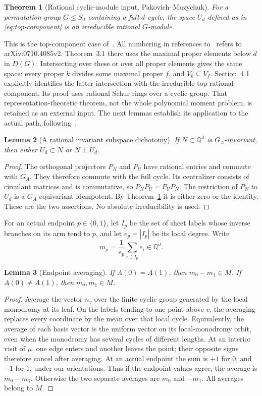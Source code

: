 \documentclass[11pt]{article}
\numberwithin{equation}{section}
\newtheorem{theorem}{Theorem}[section]
\newtheorem{lemma}[theorem]{Lemma}
\theoremstyle{definition}\newtheorem{definition}[theorem]{Definition}
\theoremstyle{remark}\newtheorem{remark}[theorem]{Remark}
\newcommand{\Q}{\mathbb Q}
\begin{document}
\begin{theorem}[Rational cyclic-module input, Pakovich--Muzychuk]
\label{thm:rational-input}
For a permutation group $G\le S_d$ containing a full $d$-cycle, the
space $U_d$ defined as in \eqref{eq:top-component} is an irreducible
rational $G$-module.
\end{theorem}
This is the top-component case of~\cite[Theorem~3.1 and Section~4.1]{PM}.
All numbering in references to~\cite{PM} refers to arXiv:0710.4085v2.
Theorem~3.1 there uses the maximal proper elements below $d$ in $D(G)$.
Intersecting over these or over all proper elements gives the same
space: every proper $k$ divides some maximal proper $f$, and
$V_k\subseteq V_f$. Section~4.1 explicitly identifies the latter
intersection with the irreducible top rational component.
Its proof uses rational Schur rings over a cyclic group. That
representation-theoretic theorem, not the whole polynomial moment problem,
is retained as an external input. The next lemmas establish its application
to the actual path, following~\cite[Section~2.2, Propositions~2.4, 2.6
and~4.1]{PM}.

\begin{lemma}[A rational invariant subspace dichotomy]\label{lem:dichotomy}
If $N\subset\Q^d$ is $G_A$-invariant, then either $U_d\subset N$ or
$N\perp U_d$.
\end{lemma}
\begin{proof}
The orthogonal projectors $P_N$ and $P_U$ have rational entries and commute
with $G_A$. They therefore commute with the full cycle. Its centralizer
consists of circulant matrices and is commutative, so $P_NP_U=P_UP_N$.
The restriction of $P_N$ to $U_d$ is a $G_A$-equivariant idempotent.
By Theorem~\ref{thm:rational-input} it is either zero or the identity.
These are the two assertions. No absolute irreducibility is used.
\end{proof}

For an actual endpoint $p\in\{0,1\}$, let $I_p$ be the set of sheet labels
whose inverse branches on its arm tend to $p$, and let $e_p=|I_p|$ be
its local degree. Write
\[
 m_p=\frac1{e_p}\sum_{i\in I_p}e_i\in\Q^d.
\]
\begin{lemma}[Endpoint averaging]\label{lem:averaging}
If $A(0)=A(1)$, then $m_0-m_1\in M$. If $A(0)\ne A(1)$, then
$m_0,m_1\in M$.
\end{lemma}
\begin{proof}
Average the vector $n_v$ over the finite cyclic group generated by the
local monodromy at its leaf. On the labels tending to one point above
$v$, the averaging replaces every coordinate by the mean over that
local cycle. Equivalently, the average of each basis vector is the
uniform vector on its local-monodromy orbit, even when the monodromy
has several cycles of different lengths. At an interior visit of $\mu$,
one edge enters and another leaves the point; their opposite signs
therefore cancel after averaging. At an actual endpoint
the sum is $+1$ for $0$, and $-1$ for $1$, under our orientations.
Thus if the endpoint values agree, the average is $m_0-m_1$.
Otherwise the two separate averages are $m_0$ and $-m_1$.
All averages belong to $M$.
\end{proof}
\end{document}
